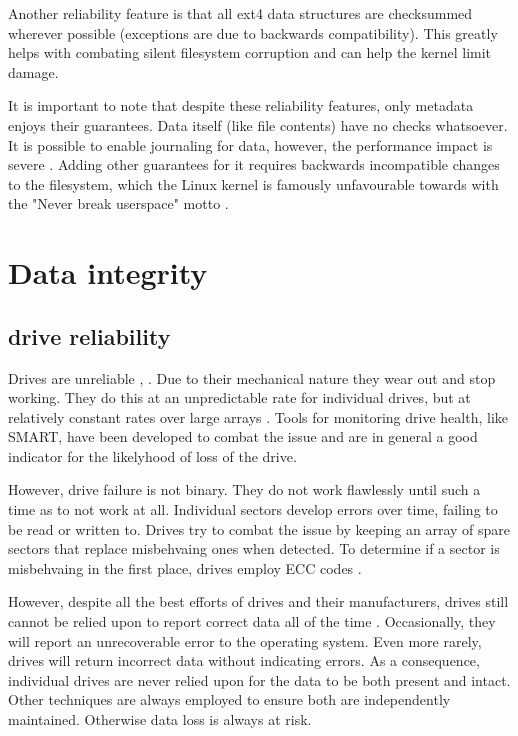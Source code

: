             Another reliability feature is that all ext4 data structures are
            checksummed wherever possible (exceptions are due to backwards
            compatibility). This greatly helps with combating silent
            filesystem corruption and can help the kernel limit damage.

            It is important to note that despite these reliability features,
            only metadata enjoys their guarantees. Data itself (like file
            contents) have no checks whatsoever. It is possible to enable
            journaling for data, however, the performance impact is severe
            \cite{ext4_docs}. Adding other guarantees for it requires backwards
            incompatible changes to the filesystem, which the Linux kernel is
            famously unfavourable towards with the "Never break userspace"
            motto \cite{never_break_userspace}.

    \section{Data integrity}

        \subsection{drive reliability}
            \label{sec_reliability}

            Drives are unreliable \cite{RAID}, \cite{Backblaze_stats}. Due to
            their mechanical nature they wear out and stop working. They do
            this at an unpredictable rate for individual drives, but at
            relatively constant rates over large arrays \cite{Backblaze_stats}.
            Tools for monitoring drive health, like SMART, have been developed
            to combat the issue and are in general a good indicator for the
            likelyhood of loss of the drive.

            However, drive failure is not binary. They do not work flawlessly
            until such a time as to not work at all. Individual sectors develop
            errors over time, failing to be read or written to.  Drives try to
            combat the issue by keeping an array of spare sectors that replace
            misbehvaing ones when detected. To determine if a sector is
            misbehvaing in the first place, drives employ ECC codes
            \cite{data_corruption_storage_stack}.

            However, despite all the best efforts of drives and their
            manufacturers, drives still cannot be relied upon to report correct
            data all of the time \cite{data_corruption_storage_stack}.
            Occasionally, they will report an unrecoverable error to the
            operating system. Even more rarely, drives will return incorrect
            data without indicating errors. As a consequence, individual drives
            are never relied upon for the data to be both present and intact.
            Other techniques are always employed to ensure both are
            independently maintained. Otherwise data loss is always at risk.

